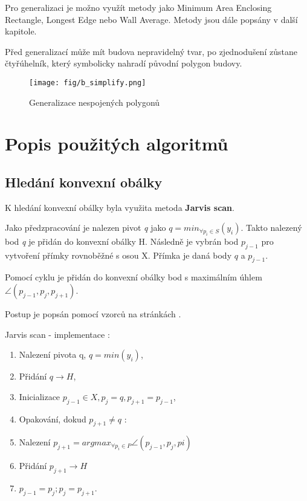 \documentclass[oneside,12pt,a4paper]{book}
\begin{document}
Pro generalizaci je možno využít metody jako Minimum Area Enclosing Rectangle, Longest Edge nebo Wall Average. Metody jsou dále popsány v další kapitole.\par

Před generalizací může mít budova nepravidelný tvar, po zjednodušení zůstane čtyřúhelník, který symbolicky nahradí původní polygon budovy.

\begin{figure}[ht!]
    \centering
    \texttt{[image: fig/b\_simplify.png]}
    \caption{Generalizace nespojených polygonů \cite{gpcd}}
    \label{fig:Generalizace polygonu}
\end{figure}


\bigskip


\chapter{Popis použitých algoritmů}
\label{kapitola: Popis použitých algoritmů}

\section{Hledání konvexní obálky}

K hledání konvexní obálky byla využita metoda \textbf{Jarvis scan}.\par
Jako předzpracování je nalezen pivot \emph{q} jako $q = min_{\forall p_i \in S }(y_i)$. Takto nalezený bod \emph{q} je přidán do konvexní obálky H. Následně je vybrán bod $p_{j-1}$ pro vytvoření přímky rovnoběžné s osou X. Přímka je daná body $q$ a $p_{j-1}$.\par
Pomocí cyklu je přidán do konvexní obálky bod s maximálním úhlem $\angle (p_{j-1}, p_j, p_{j+1})$.\par
Postup je popsán pomocí vzorců na stránkách \cite{plp} .

\bigskip

Jarvis scan - implementace $:$
\begin{enumerate}
\item Nalezení pivota q, $q = min(y_i)$,
\item Přidání $q \rightarrow H$,
\item Inicializace $p_{j-1} \in X, p_j = q, p_{j+1} = p_{j-1}$,
\item Opakování, dokud $p_{j+1} \neq q$ $:$
\item \quad Nalezení $p_{j+1} = arg max_{\forall p_i \in P } \angle (p_{j-1},p_j, pi)$
\item \quad Přidání $p_{j+1} \rightarrow H$
\item \quad $p_{j-1}=p_j ; p_j = p_{j+1}$.
\end{enumerate}
\end{document}
